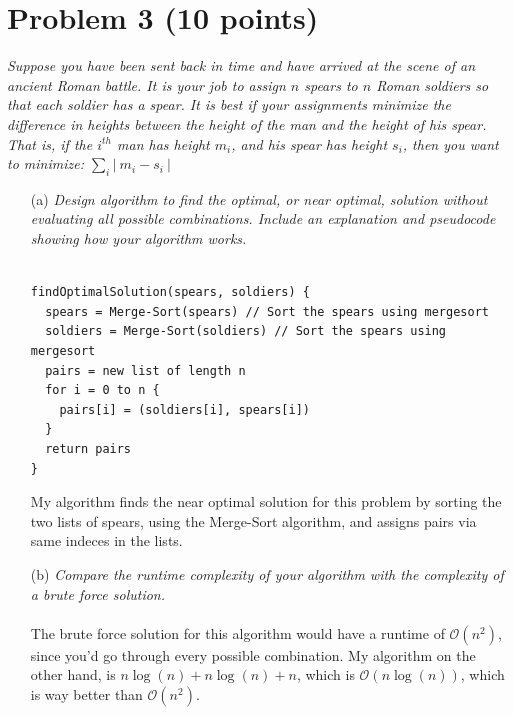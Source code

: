 \documentclass[12pt]{article}
\begin{document}
{\section*{{\selectfont Problem 3 (10 points)}}\vspace{-10mm}
\textsl{Suppose you have been sent back in time and have arrived at the scene of an ancient Roman battle. It is your job to assign $n$ spears to $n$ Roman soldiers so that each soldier has a spear. It is best if your assignments minimize the difference in heights between the height of the man and the height of his spear. That is, if the $i^{th}$ man has height $m_i$, and his spear has height $s_i$, then you want to minimize: $\sum_{i} \left| ~ m_i - s_i ~ \right|$}
\begin{enumerate}
\item[(a)]\textsl{Design algorithm to find the optimal, or near optimal, solution without evaluating all possible combinations. Include an explanation and pseudocode showing how your algorithm works.}\\ \\
\begin{lstlisting}
findOptimalSolution(spears, soldiers) {
  spears = Merge-Sort(spears) // Sort the spears using mergesort
  soldiers = Merge-Sort(soldiers) // Sort the spears using mergesort
  pairs = new list of length n
  for i = 0 to n {
    pairs[i] = (soldiers[i], spears[i])
  }
  return pairs
}
\end{lstlisting}
My algorithm finds the near optimal solution for this problem by sorting the two lists of spears, using the Merge-Sort algorithm, and assigns pairs via same indeces in the lists.
\item[(b)]\textsl{Compare the runtime complexity of your algorithm with the complexity of a brute force solution.}\\ \\
The brute force solution for this algorithm would have a runtime of $\mathcal{O}(n^2)$, since you'd go through every possible combination. My algorithm on the other hand, is $n\log(n) + n\log(n) + n$, which is $\mathcal{O}(n\log(n))$, which is way better than $\mathcal{O}(n^2)$.
\end{enumerate}

\newpage
}
\end{document}
